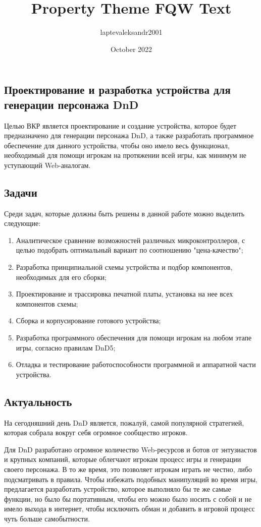 \documentclass[12pt,a4paper]{article}
\title{Property Theme FQW Text}
\author{laptevaleksandr2001 }
\date{October 2022}
\begin{document}
\subsection{Проектирование и разработка устройства для генерации персонажа DnD}

Целью ВКР является проектирование и создание устройства, которое будет предназначено для генерации персонажа DnD, а также разработать программное обеспечение для данного устройства, чтобы оно имело весь функционал, необходимый для помощи игрокам на протяжении всей игры, как минимум не уступающий Web-аналогам.

\subsection{Задачи}

Среди задач, которые должны быть решены в данной работе можно выделить следующие:
\begin{enumerate}
    \item Аналитическое сравнение возможностей различных микроконтроллеров, с целью подобрать оптимальный вариант по соотношению "цена-качество";

    \item Разработка принципиальной схемы устройства и подбор компонентов, необходимых для его сборки;

    \item Проектирование и трассировка печатной платы, установка на нее всех компонентов схемы;

    \item Сборка и корпусирование готового устройства;

    \item Разработка программного обеспечения для помощи игрокам на любом этапе игры, согласно правилам DnD5;

    \item Отладка и тестирование работоспособности программной и аппаратной части устройства.
\end{enumerate}

\subsection{Актуальность}

На сегодняшний день DnD является, пожалуй, самой популярной стратегией, которая собрала вокруг себя огромное сообщество игроков.

Для DnD разработано огромное количество Web-ресурсов и ботов от энтузиастов и крупных компаний, которые облегчают игрокам процесс игры и генерации своего персонажа. В то же время, это позволяет игрокам играть не честно, либо подсматривать в правила. Чтобы избежать подобных манипуляций во время игры, предлагается разработать устройство, которое выполняло бы те же самые функции, но было бы портативным, чтобы его можно было носить с собой и не имело выхода в интернет, чтобы исключить обман и добавить в игровой процесс чуть больше самобытности.
\end{document}

